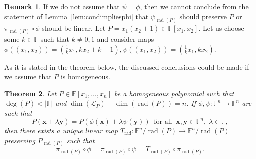 \documentclass{elsarticle}
\DeclareMathOperator{\rad}{rad}
\def\F{{\mathbb F}}
\newtheorem{theorem}{Theorem}[section]
\theoremstyle{definition}
\newtheorem{remark}[theorem]{Remark}
\numberwithin{equation}{section}
\begin{document}
\begin{remark}
If we do not assume that $\psi = \phi$, then we cannot conclude from the statement of Lemma~\ref{lem:condimpliesphi} that $\psi_{\rad(P)}$ should preserve $P$ or $\pi_{\rad(P)} \circ \phi$ should be linear. Let $P = x_1(x_2 + 1) \in \F[x_1, x_2].$ Let us choose some $k \in \F$ such that $k \neq 0, 1$ and consider maps $\phi((x_1,x_2)) = (\frac{1}{k}x_1,k x_2 + k - 1), \psi ((x_1,x_2)) = (\frac{1}{k}x_1, kx_2).$

As it is stated in the theorem below, the discussed conclusions could be made if we assume that $P$ is homogeneous.
\end{remark}

\begin{theorem}\label{thm:homogenphipsi}Let $P \in \F[x_1,\ldots, x_n]$ be a homogeneous polynomial such that $\deg (P) < |\F|$ and $\dim (\mathcal L_P) + \dim (\rad(P)) = n$.  If  $\phi, \psi \colon \F^n \to \F^n$ are such that
\begin{equation}\label{thm:homogenphipsi:eqq1}
P(\mathbf{x} + \lambda \mathbf{y}) = P(\phi(\mathbf{x}) + \lambda \psi(\mathbf{y}))\;\;\mbox{for all}\;\;\mathbf{x},\mathbf{y} \in \mathbb \F^n,\; \lambda \in \F,
\end{equation}
then there exists a unique linear map $T_{\rad} \colon \F^n/\rad(P) \to \F^n/\rad(P)$ preserving $P_{\rad(P)}$ such that
\begin{equation*}\label{thm:homogenphipsi:eq}
\pi_{\rad(P)} \circ \phi = \pi_{\rad(P)} \circ \psi = T_{\rad(P)} \circ \pi_{\rad(P)}. 
\end{equation*}
\end{theorem} 
\end{document}

